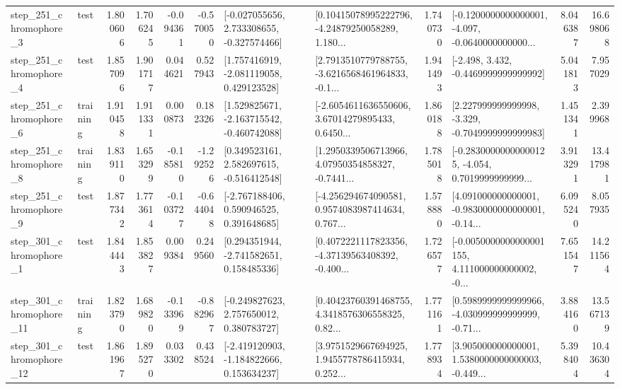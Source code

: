 \begin{tabular}{llrrrrllrlrr}
   step\_251\_chromophore\_3 &      test &      1.800606 &    1.706245 &     -0.094361 & -0.570050 &   [-0.027055656, 2.733308655, -0.327574466] &  [0.10415078995222796, -4.24879250058289, 1.180... &       1.740730 &  [-0.1200000000000001, -4.097, -0.0640000000000... &            8.046387 &         16.698068 \\
   step\_251\_chromophore\_4 &      test &      1.857096 &    1.901717 &      0.044621 &  0.527943 &    [1.757416919, -2.081119058, 0.429123528] &  [2.7913510779788755, -3.6216568461964833, -0.1... &       1.941493 &               [-2.498, 3.432, -0.4469999999999992] &            5.041813 &          7.957029 \\
   step\_251\_chromophore\_6 &  training &      1.910458 &    1.911331 &      0.000873 &  0.182326 &   [1.529825671, -2.163715542, -0.460742088] &  [-2.6054611636550606, 3.67014279895433, 0.6450... &       1.860188 &   [2.227999999999998, -3.329, -0.7049999999999983] &            1.451341 &          2.399968 \\
   step\_251\_chromophore\_8 &  training &      1.839110 &    1.653299 &     -0.185810 & -1.292526 &    [0.349523161, 2.582697615, -0.516412548] &  [1.2950339506713966, 4.07950354858327, -0.7441... &       1.785018 &  [-0.28300000000000125, -4.054, 0.7019999999999... &            3.913291 &         13.417981 \\
   step\_251\_chromophore\_9 &      test &      1.877342 &    1.773614 &     -0.103727 & -0.644048 &    [-2.767188406, 0.590946525, 0.391648685] &  [-4.256294674090581, 0.9574083987414634, 0.767... &       1.578880 &  [4.091000000000001, -0.9830000000000001, -0.14... &            6.095240 &          8.057935 \\
   step\_301\_chromophore\_1 &      test &      1.844443 &    1.853827 &      0.009384 &  0.249560 &    [0.294351944, -2.741582651, 0.158485336] &  [0.4072221117823356, -4.37139563408392, -0.400... &       1.726577 &  [-0.0050000000000001155, 4.111000000000002, -0... &            7.651547 &         14.211564 \\
  step\_301\_chromophore\_11 &  training &      1.823790 &    1.689820 &     -0.133969 & -0.882967 &    [-0.249827623, 2.757650012, 0.380783727] &  [0.40423760391468755, 4.3418576306558325, 0.82... &       1.771161 &  [0.5989999999999966, -4.030999999999999, -0.71... &            3.884160 &         13.567139 \\
  step\_301\_chromophore\_12 &      test &      1.861967 &    1.895270 &      0.033302 &  0.438524 &   [-2.419120903, -1.184822666, 0.153634237] &  [3.9751529667694925, 1.9455778786415934, 0.252... &       1.778934 &  [3.905000000000001, 1.5380000000000003, -0.449... &            5.398404 &         10.436304 \\

\end{tabular}
